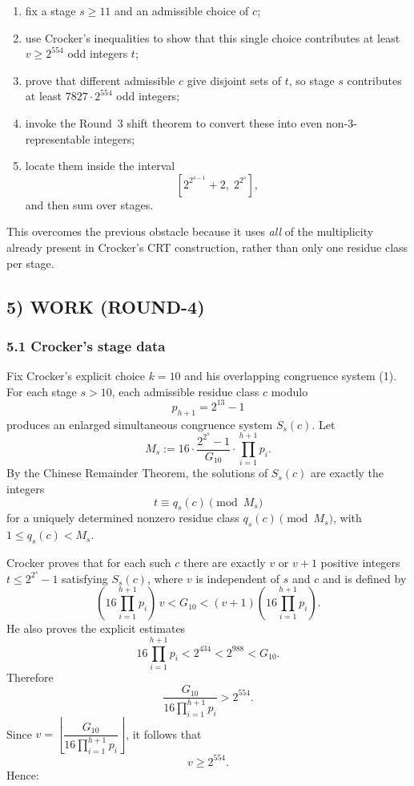 \begin{enumerate}
\item fix a stage $s\ge 11$ and an admissible choice of $c$;
\item use Crocker's inequalities to show that this single choice contributes at least $v\ge 2^{554}$ odd integers $t$;
\item prove that different admissible $c$ give disjoint sets of $t$, so stage $s$ contributes at least $7827\cdot 2^{554}$ odd integers;
\item invoke the Round~3 shift theorem to convert these into even non-$3$-representable integers;
\item locate them inside the interval
\[
[2^{2^{s-1}}+2,\;2^{2^s}],
\]
and then sum over stages.
\end{enumerate}

This overcomes the previous obstacle because it uses \emph{all} of the multiplicity already present in Crocker's CRT construction, rather than only one residue class per stage.

\subsection{5) WORK (ROUND-4)}

\subsubsection{5.1 Crocker's stage data}

Fix Crocker's explicit choice $k=10$ and his overlapping congruence system (1). For each stage $s>10$, each admissible residue class $c$ modulo
\[
p_{h+1}=2^{13}-1
\]
produces an enlarged simultaneous congruence system $S_s(c)$.
Let
\[
M_s:=16\cdot \frac{2^{2^s}-1}{G_{10}}\cdot \prod_{i=1}^{h+1}p_i.
\]
By the Chinese Remainder Theorem, the solutions of $S_s(c)$ are exactly the integers
\[
t\equiv q_s(c)\pmod{M_s}
\]
for a uniquely determined nonzero residue class $q_s(c)\pmod{M_s}$, with $1\le q_s(c)<M_s$.

Crocker proves that for each such $c$ there are exactly $v$ or $v+1$ positive integers $t\le 2^{2^s}-1$ satisfying $S_s(c)$, where $v$ is independent of $s$ and $c$ and is defined by
\[
(16\prod_{i=1}^{h+1}p_i)\,v<G_{10}<(v+1)(16\prod_{i=1}^{h+1}p_i).
\]
He also proves the explicit estimates
\[
16\prod_{i=1}^{h+1}p_i<2^{434}<2^{988}<G_{10}.
\]
Therefore
\[
\frac{G_{10}}{16\prod_{i=1}^{h+1}p_i}>2^{554}.
\]
Since $v=\left\lfloor \dfrac{G_{10}}{16\prod_{i=1}^{h+1}p_i}\right\rfloor$, it follows that
\[
v\ge 2^{554}.
\]
Hence:

